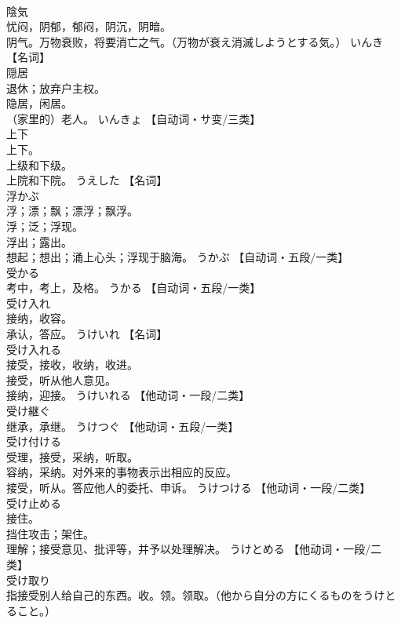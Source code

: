 \documentclass[8pt]{extreport}
\begin{document}
\begin{CJK}{UTF8}{min}
\\	陰気	
\\	忧闷，阴郁，郁闷，阴沉，阴暗。 
\\	阴气。万物衰败，将要消亡之气。（万物が衰え消滅しようとする気。）	いんき		【名词】
\\	隠居	
\\	退休；放弃户主权。 
\\	隐居，闲居。 
\\	（家里的）老人。	いんきょ		【自动词・サ变/三类】
\\	上下	
\\	上下。 
\\	上级和下级。 
\\	上院和下院。	うえした		【名词】
\\	浮かぶ	
\\	浮；漂；飘；漂浮；飘浮。 
\\	浮；泛；浮现。 
\\	浮出；露出。 
\\	想起；想出；涌上心头；浮现于脑海。	うかぶ		【自动词・五段/一类】
\\	受かる	
\\	考中，考上，及格。	うかる		【自动词・五段/一类】
\\	受け入れ	
\\	接纳，收容。 
\\	承认，答应。	うけいれ		【名词】
\\	受け入れる	
\\	接受，接收，收纳，收进。 
\\	接受，听从他人意见。 
\\	接纳，迎接。	うけいれる		【他动词・一段/二类】
\\	受け継ぐ	
\\	继承，承继。	うけつぐ		【他动词・五段/一类】
\\	受け付ける	
\\	受理，接受，采纳，听取。 
\\	容纳，采纳。对外来的事物表示出相应的反应。 
\\	接受，听从。答应他人的委托、申诉。	うけつける		【他动词・一段/二类】
\\	受け止める	
\\	接住。 
\\	挡住攻击；架住。 
\\	理解；接受意见、批评等，并予以处理解决。	うけとめる		【他动词・一段/二类】
\\	受け取り	
\\	指接受别人给自己的东西。收。领。领取。（他から自分の方にくるものをうけとること。） 

\end{CJK}
\end{document}
